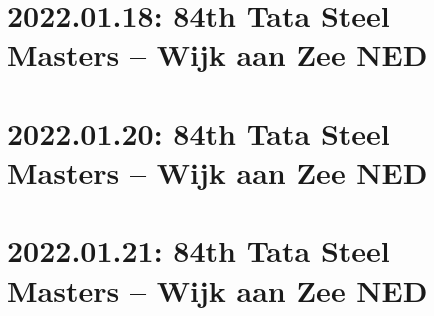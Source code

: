 \documentclass[11pt]{article}
\begin{document}

\pagebreak[4]


\pagebreak[4]


\pagebreak[4]


\pagebreak[4]


\pagebreak[4]


\pagebreak[4]

\section{2022.01.18: 84th Tata Steel Masters -- Wijk aan Zee NED}

\pagebreak[4]


\pagebreak[4]


\pagebreak[4]


\pagebreak[4]


\pagebreak[4]


\pagebreak[4]


\pagebreak[4]

\section{2022.01.20: 84th Tata Steel Masters -- Wijk aan Zee NED}

\pagebreak[4]


\pagebreak[4]


\pagebreak[4]


\pagebreak[4]


\pagebreak[4]


\pagebreak[4]


\pagebreak[4]

\section{2022.01.21: 84th Tata Steel Masters -- Wijk aan Zee NED}

\pagebreak[4]


\pagebreak[4]


\pagebreak[4]


\pagebreak[4]


\pagebreak[4]
\end{document}
